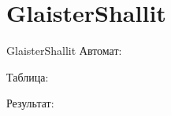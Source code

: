 \section{GlaisterShallit}
\begin{frame}{GlaisterShallit}
	Автомат:


	Таблица:


	Результат:

\end{frame}
